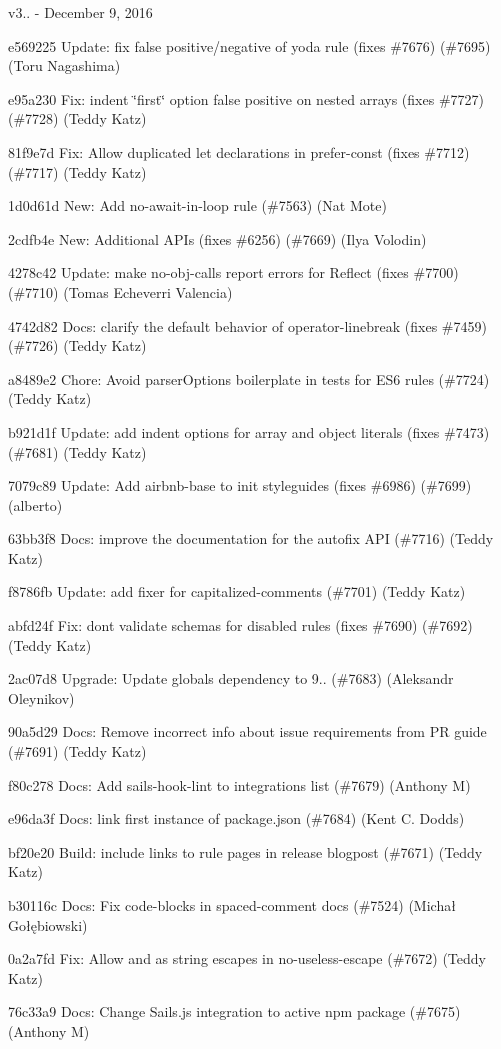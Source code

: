 v3.. -\/ December 9, 2016


\begin{DoxyItemize}
\item e569225 Update\+: fix false positive/negative of yoda rule (fixes \#7676) (\#7695) (Toru Nagashima)
\item e95a230 Fix\+: indent \char`\"{}first\char`\"{} option false positive on nested arrays (fixes \#7727) (\#7728) (Teddy Katz)
\item 81f9e7d Fix\+: Allow duplicated let declarations in {\ttfamily prefer-\/const} (fixes \#7712) (\#7717) (Teddy Katz)
\item 1d0d61d New\+: Add no-\/await-\/in-\/loop rule (\#7563) (Nat Mote)
\item 2cdfb4e New\+: Additional A\+P\+Is (fixes \#6256) (\#7669) (Ilya Volodin)
\item 4278c42 Update\+: make no-\/obj-\/calls report errors for Reflect (fixes \#7700) (\#7710) (Tomas Echeverri Valencia)
\item 4742d82 Docs\+: clarify the default behavior of {\ttfamily operator-\/linebreak} (fixes \#7459) (\#7726) (Teddy Katz)
\item a8489e2 Chore\+: Avoid parser\+Options boilerplate in tests for E\+S6 rules (\#7724) (Teddy Katz)
\item b921d1f Update\+: add {\ttfamily indent} options for array and object literals (fixes \#7473) (\#7681) (Teddy Katz)
\item 7079c89 Update\+: Add airbnb-\/base to init styleguides (fixes \#6986) (\#7699) (alberto)
\item 63bb3f8 Docs\+: improve the documentation for the autofix A\+PI (\#7716) (Teddy Katz)
\item f8786fb Update\+: add fixer for {\ttfamily capitalized-\/comments} (\#7701) (Teddy Katz)
\item abfd24f Fix\+: don\textquotesingle{}t validate schemas for disabled rules (fixes \#7690) (\#7692) (Teddy Katz)
\item 2ac07d8 Upgrade\+: Update globals dependency to 9.. (\#7683) (Aleksandr Oleynikov)
\item 90a5d29 Docs\+: Remove incorrect info about issue requirements from PR guide (\#7691) (Teddy Katz)
\item f80c278 Docs\+: Add sails-\/hook-\/lint to integrations list (\#7679) (Anthony M)
\item e96da3f Docs\+: link first instance of {\ttfamily package.\+json} (\#7684) (Kent C. Dodds)
\item bf20e20 Build\+: include links to rule pages in release blogpost (\#7671) (Teddy Katz)
\item b30116c Docs\+: Fix code-\/blocks in spaced-\/comment docs (\#7524) (Michał Gołębiowski)
\item 0a2a7fd Fix\+: Allow  and  as string escapes in no-\/useless-\/escape (\#7672) (Teddy Katz)
\item 76c33a9 Docs\+: Change Sails.\+js integration to active npm package (\#7675) (Anthony M)
\end{DoxyItemize}

